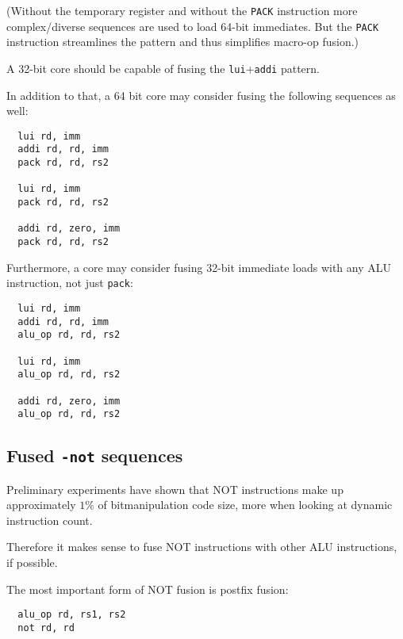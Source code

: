 (Without the temporary register and without the {\tt PACK} instruction more complex/diverse
sequences are used to load 64-bit immediates. But the {\tt PACK} instruction streamlines
the pattern and thus simplifies macro-op fusion.)

A 32-bit core should be capable of fusing the {\tt lui}+{\tt addi} pattern.

In addition to that, a 64 bit core may consider fusing the following sequences as well:

\begin{minipage}{\linewidth}
\begin{verbatim}
  lui rd, imm
  addi rd, rd, imm
  pack rd, rd, rs2

  lui rd, imm
  pack rd, rd, rs2

  addi rd, zero, imm
  pack rd, rd, rs2
\end{verbatim}
\end{minipage}

Furthermore, a core may consider fusing 32-bit immediate loads with any ALU
instruction, not just {\tt pack}:

\begin{minipage}{\linewidth}
\begin{verbatim}
  lui rd, imm
  addi rd, rd, imm
  alu_op rd, rd, rs2

  lui rd, imm
  alu_op rd, rd, rs2

  addi rd, zero, imm
  alu_op rd, rd, rs2
\end{verbatim}
\end{minipage}


\subsection{Fused {\tt *-not} sequences}

Preliminary experiments have shown that NOT instructions make up approximately
$1\%$ of bitmanipulation code size, more when looking at dynamic instruction count.~\cite{Wolf17A}

Therefore it makes sense to fuse NOT instructions with other ALU instructions, if possible.

The most important form of NOT fusion is postfix fusion:

\begin{minipage}{\linewidth}
\begin{verbatim}
  alu_op rd, rs1, rs2
  not rd, rd
\end{verbatim}
\end{minipage}

